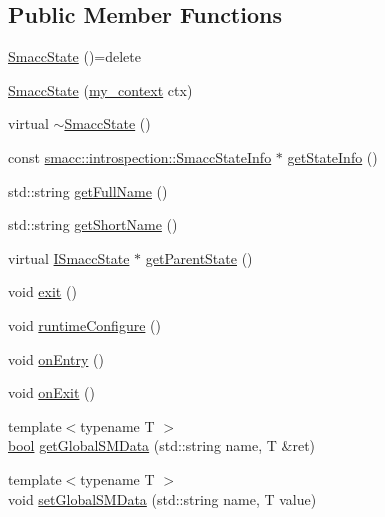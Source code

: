 \subsection*{Public Member Functions}
\begin{DoxyCompactItemize}
\item 
\hyperlink{classsmacc_1_1SmaccState_a2fbeaca0f063a909d17de2c3040c8d17}{Smacc\+State} ()=delete
\item 
\hyperlink{classsmacc_1_1SmaccState_adc225018fe91da47e6e9f1d20150b26a}{Smacc\+State} (\hyperlink{structsmacc_1_1SmaccState_1_1my__context}{my\+\_\+context} ctx)
\item 
virtual \hyperlink{classsmacc_1_1SmaccState_a41b2515faf76648c6d69fe09108d2691}{$\sim$\+Smacc\+State} ()
\item 
const \hyperlink{classsmacc_1_1introspection_1_1SmaccStateInfo}{smacc\+::introspection\+::\+Smacc\+State\+Info} $\ast$ \hyperlink{classsmacc_1_1SmaccState_ab7825f5db39dcbee4e4384913026d3e2}{get\+State\+Info} ()
\item 
std\+::string \hyperlink{classsmacc_1_1SmaccState_a897dbdfe52a8b944d4bf1844ddcc3aa5}{get\+Full\+Name} ()
\item 
std\+::string \hyperlink{classsmacc_1_1SmaccState_a4db028a85244653e48957d2b3371413d}{get\+Short\+Name} ()
\item 
virtual \hyperlink{classsmacc_1_1ISmaccState}{I\+Smacc\+State} $\ast$ \hyperlink{classsmacc_1_1SmaccState_a69fc0aa1dbe0c00501f2890616225004}{get\+Parent\+State} ()
\item 
void \hyperlink{classsmacc_1_1SmaccState_a34b22a3b1af1796f2bdc1383eeef3a74}{exit} ()
\item 
void \hyperlink{classsmacc_1_1SmaccState_a6995704a0232e24f4c38250302c0a01f}{runtime\+Configure} ()
\item 
void \hyperlink{classsmacc_1_1SmaccState_a4a10a74fdbe51a798b8d651668b8ed9a}{on\+Entry} ()
\item 
void \hyperlink{classsmacc_1_1SmaccState_a82ca7c69153e86dc5eedf3f909560f3a}{on\+Exit} ()
\item 
{\footnotesize template$<$typename T $>$ }\\\hyperlink{classbool}{bool} \hyperlink{classsmacc_1_1SmaccState_ad53b5be2760eb7ffb50f3b2e542b65f1}{get\+Global\+S\+M\+Data} (std\+::string name, T \&ret)
\item 
{\footnotesize template$<$typename T $>$ }\\void \hyperlink{classsmacc_1_1SmaccState_a98f2673b257479e0a3615d5d8279a591}{set\+Global\+S\+M\+Data} (std\+::string name, T value)

\end{DoxyCompactItemize}

